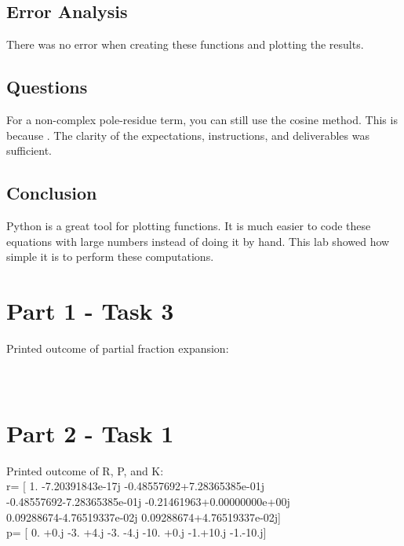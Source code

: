 \documentclass[12pt]{report}
\begin{document}
\section{Error Analysis}
There was no error when creating these functions and plotting the results.

\section{Questions}
For a non-complex pole-residue term, you can still use the cosine method. This is because . The clarity of the expectations, instructions, and deliverables was sufficient. 

\section{Conclusion}
Python is a great tool for plotting functions. It is much easier to code these equations with large numbers instead of doing it by hand. This lab showed how simple it is to perform these computations. 

\begin{appendices}
\chapter{Part 1 - Task 3}

Printed outcome of partial fraction expansion:\\

\noindent [ 0.5 -0.5  1. ]\\
\noindent [ 0. -4. -6.]\\
\noindent [ ]

\chapter{Part 2 - Task 1}

Printed outcome of R, P, and K:\\

\noindent r= [ 1.  -7.20391843e-17j -0.48557692+7.28365385e-01j\\
 -0.48557692-7.28365385e-01j -0.21461963+0.00000000e+00j\\
  0.09288674-4.76519337e-02j  0.09288674+4.76519337e-02j] \\
  
\noindent p= [  0. +0.j  -3. +4.j  -3. -4.j -10. +0.j  -1.+10.j  -1.-10.j]



\end{appendices}
\end{document}
